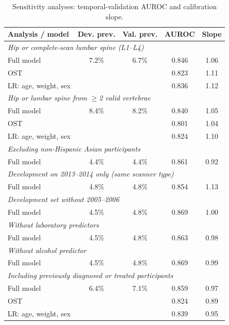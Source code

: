 \documentclass[11pt,a4paper]{article}
\begin{document}
\begin{table}[H]
\centering
\caption{Sensitivity analyses: temporal-validation AUROC and calibration slope.}
\label{tab:sens}
\small
\begin{tabular}{lcccc}
\toprule
Analysis / model & Dev. prev. & Val. prev. & AUROC & Slope \\
\midrule
\multicolumn{5}{l}{\textit{Hip or complete-scan lumbar spine (L1--L4)}} \\
\quad Full model & 7.2\% & 6.7\% & 0.846 & 1.06 \\
\quad OST &  &  & 0.823 & 1.11 \\
\quad LR: age, weight, sex &  &  & 0.836 & 1.12 \\
\multicolumn{5}{l}{\textit{Hip or lumbar spine from $\ge$2 valid vertebrae}} \\
\quad Full model & 8.4\% & 8.2\% & 0.840 & 1.05 \\
\quad OST &  &  & 0.801 & 1.04 \\
\quad LR: age, weight, sex &  &  & 0.824 & 1.10 \\
\multicolumn{5}{l}{\textit{Excluding non-Hispanic Asian participants}} \\
\quad Full model & 4.4\% & 4.4\% & 0.861 & 0.92 \\
\multicolumn{5}{l}{\textit{Development on 2013--2014 only (same scanner type)}} \\
\quad Full model & 4.8\% & 4.8\% & 0.854 & 1.13 \\
\multicolumn{5}{l}{\textit{Development set without 2005--2006}} \\
\quad Full model & 4.5\% & 4.8\% & 0.869 & 1.00 \\
\multicolumn{5}{l}{\textit{Without laboratory predictors}} \\
\quad Full model & 4.5\% & 4.8\% & 0.863 & 0.98 \\
\multicolumn{5}{l}{\textit{Without alcohol predictor}} \\
\quad Full model & 4.5\% & 4.8\% & 0.869 & 0.99 \\
\multicolumn{5}{l}{\textit{Including previously diagnosed or treated participants}} \\
\quad Full model & 6.4\% & 7.1\% & 0.859 & 0.97 \\
\quad OST &  &  & 0.824 & 0.89 \\
\quad LR: age, weight, sex &  &  & 0.839 & 0.95 \\
\bottomrule
\end{tabular}
\end{table}
\end{document}
